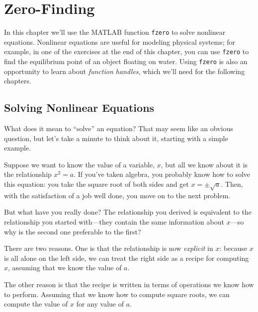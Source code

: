 \chapter{Zero-Finding}
\label{fzero}

In this chapter we'll use the MATLAB function \lstinline{fzero} to solve nonlinear equations.
Nonlinear equations are useful for modeling physical systems; for example, in one of
the exercises at the end of this chapter, you can use \lstinline{fzero} to find the equilibrium point of an object floating on water.
Using \lstinline{fzero} is also an opportunity to learn about \emph{function handles}, which we'll need for the following chapters.

\section{Solving Nonlinear Equations}


What does it mean to ``solve'' an equation?  That may seem like an
obvious question, but let's take a minute to think about it,
starting with a simple \mbox{example}.

Suppose we want to know the
value of a variable, $x$, but all we know about it is the relationship
$x^2 = a$. If you've taken algebra, you probably \linebreak know how to solve this
equation: you take the square root of both sides and get
$x = \pm \sqrt{a}$.  Then, with the satisfaction of a job well done,
you move on to the next problem.


But what have you really done?  The relationship you derived is
equivalent to the relationship you started with---they contain the
same information about $x$---so why is the second one preferable
to the first?

There are two reasons.  One is that the relationship is now \emph{explicit} in $x$: because $x$ is all alone on the left side, we can treat the right side as a recipe for computing $x$, assuming that we know the value of $a$.


The other reason is that the recipe is written in terms of operations
we know how to perform.  Assuming that we know how to compute square
roots, we can compute the value of $x$ for any value of $a$.

